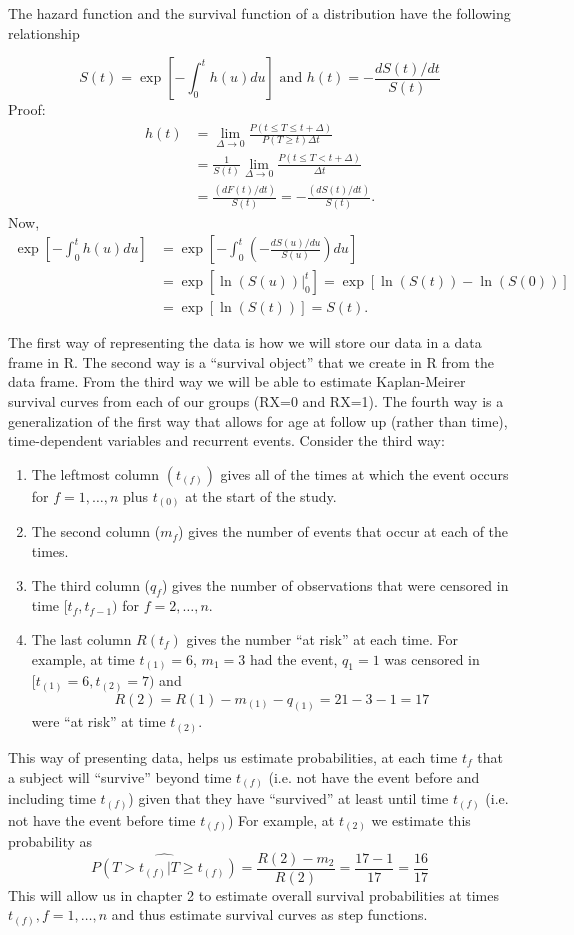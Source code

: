 \documentclass{article}
\begin{document}
 The hazard function and the survival function of a distribution have the following relationship

\[ S(t) = \exp\left[-\int_0^t h(u) du\right] \text{ and } h(t) = -\frac{d S(t)/dt}{S(t)}
\]
Proof:
\begin{align*} h(t) & = \lim_{\Delta \rightarrow 0} \frac{P(t \le T \le t + \Delta)} {P(T \ge t) \Delta t} \\
& = \frac{1}{S(t)} \lim_{\Delta \rightarrow 0} \frac{P(t \le T < t + \Delta)} {\Delta t} \\
& = \frac{(dF(t)/dt)}{S(t)} = -\frac{(d S(t)/dt)}{S(t)}.
\end{align*}
Now,
\begin{align*}
\exp\left[-\int_0^t h(u) du\right] & = \exp\left[-\int_0^t \left(-\frac{dS(u)/du}{S(u)} \right)du\right] \\
&= \exp\left[\ln (S(u)) |_0^t \right] = \exp\left[\ln(S(t)) - \ln(S(0))\right] \\
& = \exp\left[\ln(S(t))\right] = S(t).
\end{align*}

 The first way of representing the data is how we will store our data in a data frame in R. The second way is a ``survival object'' that we create in R from the data frame. From the third way we will be able to estimate Kaplan-Meirer survival curves from each of our groups (RX=0 and RX=1). The fourth way is a generalization of the first way that allows for age at follow up (rather than time), time-dependent variables and recurrent events. Consider the third way:
\begin{enumerate}[ ]
\item The leftmost column $(t_{(f)})$ gives all of the times at which the event occurs for $f=1,\ldots,n$ plus $t_{(0)}$ at the start of the study.
\item The second column ($m_f$) gives the number of events that occur at each of the times.
\item The third column ($q_f$) gives the number of observations that were censored in time $[t_f,t_{f-1})$ for $f=2,\ldots,n$.
\item The last column $R(t_f)$ gives the number ``at risk'' at each time. For example, at time $t_{(1)}=6$, $m_{1}=3$ had the event, $q_{1}=1$ was censored in $[t_{(1)}=6, t_{(2)}=7)$ and
    \[
    R(2)=R(1)-m_{(1)}-q_{(1)}=21-3-1=17
    \]
     were ``at risk'' at time $t_{(2)}$.
\end{enumerate}
This way of presenting data, helps us estimate probabilities, at each time $t_{f}$ that a subject will ``survive'' beyond time $t_{(f)}$ (i.e. not have the event before and including time $t_{(f)}$) given that they have ``survived'' at least until time $t_{(f)}$ (i.e. not have the event before time $t_{(f)}$)  For example, at $t_{(2)}$ we estimate this probability as
\[ \widehat{P(T>t_{(f)}| T \ge t_{(f)})} =  \dfrac{R(2)-m_2}{R{(2)}} = \dfrac{17-1}{17} = \dfrac{16}{17}
\]
This will allow us in chapter 2 to estimate overall survival probabilities at times $t_{(f)}, f=1,\ldots,n$ and thus estimate survival curves as step functions.
\end{document}
